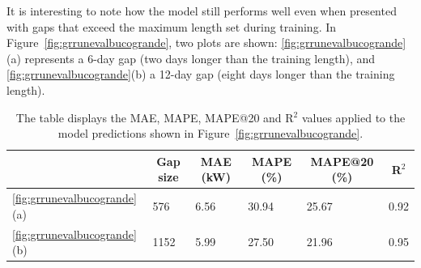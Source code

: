 It is interesting to note how the model still performs well even
when presented with gaps that exceed the maximum length set
during training.
In Figure~\ref{fig:grrunevalbucogrande}, two plots are shown:
\ref{fig:grrunevalbucogrande}(a) represents a 6-day gap (two days longer than the training length),
and \ref{fig:grrunevalbucogrande}(b) a 12-day gap (eight days longer than the training length).

\begin{table}[H]
	\begin{center}
		\begin{tabular}[c]{l|l|l|l|l|l}
			                                           &
			\multicolumn{1}{c|}{\textbf{Gap size}}     &
			\multicolumn{1}{c|}{\textbf{MAE (kW)}}     &
			\multicolumn{1}{c|}{\textbf{MAPE (\%)}}    &
			\multicolumn{1}{c|}{\textbf{MAPE@20 (\%)}} &
			\multicolumn{1}{c}{\textbf{R}$^2$}                                              \\
			\hline

			\ref{fig:grrunevalbucogrande}(a)           & 576  & 6.56 & 30.94 & 25.67 & 0.92 \\
			\ref{fig:grrunevalbucogrande}(b)           & 1152 & 5.99 & 27.50 & 21.96 & 0.95

		\end{tabular}
	\end{center}
	\caption{The table displays the MAE, MAPE, MAPE@20 and R$^2$ values applied to the model predictions shown in Figure~\ref{fig:grrunevalbucogrande}.
	}\label{tab:grrunpmaerlungo}
\end{table}



